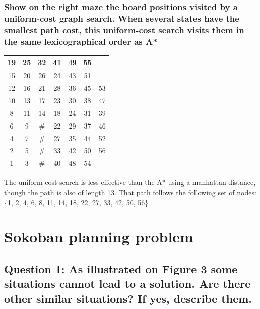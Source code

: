 \documentclass[a4paper,10pt]{article}
\begin{document}
			\subsubsection{Show on the right maze the board positions visited by a uniform-cost graph search. When several states have the smallest path cost, this uniform-cost search visits them in the same lexicographical order as A*}
			 \begin{center}
				\begin{tabular}{|c|c|c|c|c|c|c|}
					\hline 
					19 & 25 & 32 & 41 & 49 & 55 &    \\ 
					\hline 
					15 & 20 & 26 & 24 & 43 & 51 &    \\ 
					\hline 
					12 & 16 & 21 & 28 & 36 & 45 & 53 \\ 
					\hline 
					10 & 13 & 17 & 23 & 30 & 38 & 47 \\ 
					\hline 
					8  & 11 & 14 & 18 & 24 & 31 & 39 \\ 
					\hline 
					6  & 9  & \# & 22 & 29 & 37 & 46 \\ 
					\hline 
					4  & 7  & \# & 27 & 35 & 44 & 52 \\ 
					\hline 
					2  & 5  & \# & 33 & 42 & 50 & 56 \\ 
					\hline 
					1  & 3  & \# & 40 & 48 & 54 &    \\ 
					\hline 
				\end{tabular} 
			\end{center}
				The uniform cost search is less effective than the A* using a manhattan distance, though the path is also of length 13. That path follows the following set of nodes: \{1, 2, 4, 6, 8, 11, 14, 18, 22, 27, 33, 42, 50, 56\}
			
	\section{Sokoban planning problem}
	
		\subsection{Question 1: As illustrated on Figure 3 some situations cannot lead to a solution. Are there other similar situations? If yes, describe them.}
			
\end{document}
